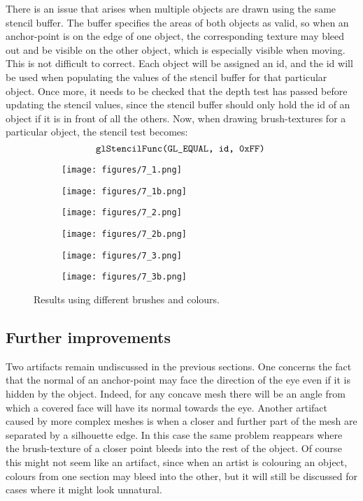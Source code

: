 \documentclass[a4paper,10pt]{article}
\begin{document}
There is an issue that arises when multiple objects are drawn using the same stencil buffer. The buffer specifies the areas of both objects as valid, so when an anchor-point is on the edge of one object, the corresponding texture may bleed out and be visible on the other object, which is especially visible when moving. This is not difficult to correct. Each object will be assigned an id, and the id will be used when populating the values of the stencil buffer for that particular object. Once more, it needs to be checked that the depth test has passed before updating the stencil values, since the stencil buffer should only hold the id of an object if it is in front of all the others. Now, when drawing brush-textures for a particular object, the stencil test becomes:
$$\texttt{glStencilFunc(GL\_EQUAL, id, 0xFF)\;}$$

\begin{figure}[htbp!]
  \centering
  \begin{subfigure}{0.5\columnwidth}
    \texttt{[image: figures/7\_1.png]}
  \end{subfigure}
  \begin{subfigure}{0.2\columnwidth}
    \texttt{[image: figures/7\_1b.png]}
  \end{subfigure}
  \begin{subfigure}{0.5\columnwidth}
    \texttt{[image: figures/7\_2.png]}
  \end{subfigure}
  \begin{subfigure}{0.2\columnwidth}
    \texttt{[image: figures/7\_2b.png]}
  \end{subfigure}
  \begin{subfigure}{0.5\columnwidth}
    \texttt{[image: figures/7\_3.png]}
  \end{subfigure}
  \begin{subfigure}{0.2\columnwidth}
    \texttt{[image: figures/7\_3b.png]}
  \end{subfigure}
  \caption{Results using different brushes and colours.}
\end{figure}


\subsection{Further improvements}
Two artifacts remain undiscussed in the previous sections. One concerns the fact that the normal of an anchor-point may face the direction of the eye even if it is hidden by the object. Indeed, for any concave mesh there will be an angle from which a covered face will have its normal towards the eye. Another artifact caused by more complex meshes is when a closer and further part of the mesh are separated by a silhouette edge. In this case the same problem reappears where the brush-texture of a closer point bleeds into the rest of the object. Of course this might not seem like an artifact, since when an artist is colouring an object, colours from one section may bleed into the other, but it will still be discussed for cases where it might look unnatural.
\end{document}
